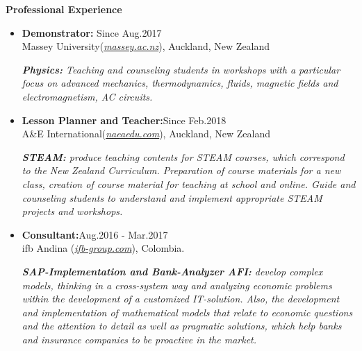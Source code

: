 \documentclass[12pt]{extarticle}
\begin{document}
\newpage
 
{\bf\Large Professional \textcolor{azul}{Experience}}\\ \vspace*{-6mm}

\begin{itemize}

  \item {\bf Demonstrator:} \hfill \textcolor{azul}{Since Aug.2017}\\
  {Massey University({\href{www.massey.ac.nz}{\textcolor{azul}{\em massey.ac.nz}}}), Auckland, New Zealand} 
  
  \emph{\textbf{Physics:} Teaching and counseling students in workshops with a particular focus on advanced mechanics, thermodynamics, fluids, magnetic fields and electromagnetism, AC circuits.} 

  \item {\bf Lesson Planner and Teacher:}\hfill \textcolor{azul}{Since Feb.2018}\\
  {A\&E International({\href{www.naeaedu.com}{\textcolor{azul}{\em naeaedu.com}}}), Auckland, New Zealand}  

  \emph{\textbf{STEAM:} produce teaching contents for STEAM courses, which correspond to the New Zealand Curriculum. Preparation of course materials for a new class, creation of course material for teaching at school and online. Guide  and counseling students to understand and implement appropriate STEAM projects and workshops.}
  
  \item {\bf Consultant:}\hfill \textcolor{azul}{Aug.2016 - Mar.2017}\\
  {ifb Andina ({\href{www.ifb-group.com/en/}{\textcolor{azul}{\em ifb-group.com}}}), Colombia.}
  
    
  \emph{\textbf{SAP-Implementation and Bank-Analyzer AFI:} %
  develop complex models, thinking in a cross-system way and analyzing economic problems within the development of a customized IT-solution. Also, the development and implementation of mathematical models that relate to economic questions and the attention to detail as well as pragmatic solutions, which help banks and insurance companies to be proactive in the market.}
  

\end{itemize}
\end{document}
